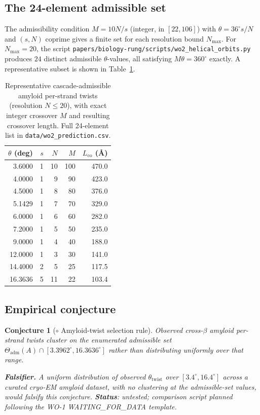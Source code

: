 \documentclass[12pt]{article}
\newtheorem{conjecture}[theorem]{Conjecture}
\begin{document}
\subsection{The 24-element admissible set}

The admissibility condition $M = 10N/s$ (integer, in
$[22, 106]$) with $\theta = 36^{\circ} s/N$ and $(s, N)$ coprime
gives a finite set for each resolution bound $N_{\max}$. For
$N_{\max} = 20$, the script
\texttt{papers/biology-rung/scripts/wo2\_helical\_orbits.py}
produces $24$ distinct admissible $\theta$-values, all
satisfying $M\theta = 360^{\circ}$ exactly. A representative
subset is shown in Table~\ref{tab:admissible}.

\begin{table}[h]
\centering
\caption{Representative cascade-admissible amyloid per-strand
twists (resolution $N \le 20$), with exact integer crossover $M$
and resulting crossover length. Full 24-element list in
\texttt{data/wo2\_prediction.csv}.}
\label{tab:admissible}
\begin{tabular}{@{}rrrrr@{}}
\toprule
$\theta$ (deg) & $s$ & $N$ & $M$ & $L_{\mathrm{co}}$ (\AA) \\
\midrule
3.6000 & 1 & 10 & 100 & 470.0 \\
4.0000 & 1 & 9 & 90 & 423.0 \\
4.5000 & 1 & 8 & 80 & 376.0 \\
5.1429 & 1 & 7 & 70 & 329.0 \\
6.0000 & 1 & 6 & 60 & 282.0 \\
7.2000 & 1 & 5 & 50 & 235.0 \\
9.0000 & 1 & 4 & 40 & 188.0 \\
12.0000 & 1 & 3 & 30 & 141.0 \\
14.4000 & 2 & 5 & 25 & 117.5 \\
16.3636 & 5 & 11 & 22 & 103.4 \\
\bottomrule
\end{tabular}
\end{table}

\subsection{Empirical conjecture}

\begin{conjecture}[$\circ$ Amyloid-twist selection rule]\label{conj:C1}
Observed cross-$\beta$ amyloid per-strand twists cluster on the
enumerated admissible set
$\Theta_{\mathrm{adm}}(A) \cap [3.3962^{\circ}, 16.3636^{\circ}]$
rather than distributing uniformly over that range.

\textbf{Falsifier.} A uniform distribution of observed
$\theta_{\mathrm{twist}}$ over $[3.4^{\circ}, 16.4^{\circ}]$
across a curated cryo-EM amyloid dataset, with no clustering at
the admissible-set values, would falsify this conjecture.
\textbf{Status}: untested; comparison script planned following
the WO-1 WAITING\_FOR\_DATA template.
\end{conjecture}
\end{document}
